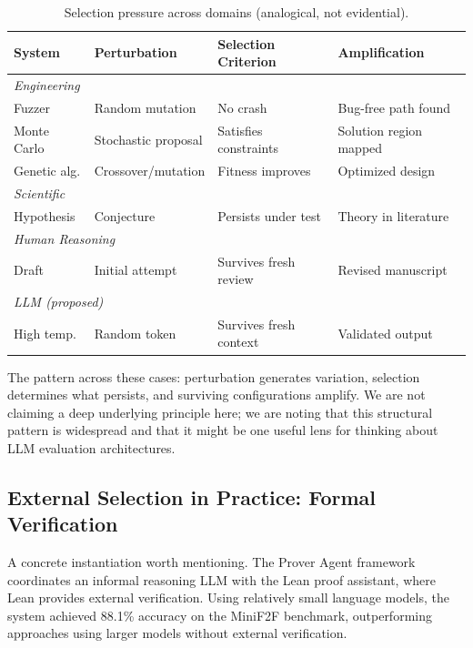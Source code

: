 \documentclass[11pt]{article}
\begin{document}
\begin{table}[ht]
\centering
\caption{Selection pressure across domains (analogical, not evidential).}
\small
\begin{tabular}{llll}
\toprule
\textbf{System} & \textbf{Perturbation} & \textbf{Selection Criterion} & \textbf{Amplification} \\
\midrule
\multicolumn{4}{l}{\textit{Engineering}} \\
Fuzzer & Random mutation & No crash & Bug-free path found \\
Monte Carlo & Stochastic proposal & Satisfies constraints & Solution region mapped \\
Genetic alg. & Crossover/mutation & Fitness improves & Optimized design \\
\midrule
\multicolumn{4}{l}{\textit{Scientific}} \\
Hypothesis & Conjecture & Persists under test & Theory in literature \\
\midrule
\multicolumn{4}{l}{\textit{Human Reasoning}} \\
Draft & Initial attempt & Survives fresh review & Revised manuscript \\
\midrule
\multicolumn{4}{l}{\textit{LLM (proposed)}} \\
High temp. & Random token & Survives fresh context & Validated output \\
\bottomrule
\end{tabular}
\end{table}

The pattern across these cases: perturbation generates variation, selection determines what persists, and surviving configurations amplify. We are not claiming a deep underlying principle here; we are noting that this structural pattern is widespread and that it might be one useful lens for thinking about LLM evaluation architectures.

\subsection{External Selection in Practice: Formal Verification}

A concrete instantiation worth mentioning. The Prover Agent framework~\citep{baba2025prover} coordinates an informal reasoning LLM with the Lean proof assistant, where Lean provides external verification. Using relatively small language models, the system achieved 88.1\% accuracy on the MiniF2F benchmark, outperforming approaches using larger models without external verification.
\end{document}
